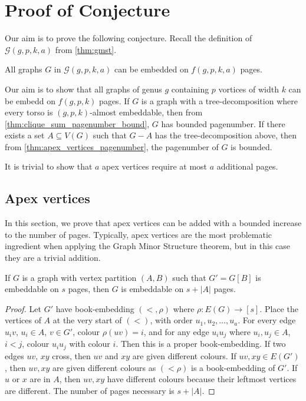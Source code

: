 \chapter{Proof of Conjecture}\label{chap:Proving_The_Theorem}
Our aim is to prove the following conjecture. Recall the definition of $\mathcal{G}(g, p, k, a)$ from \cref{thm:gmst}. 
\begin{conjecture}\label{conj:gmst_conjecture_pagenumber}
	All graphs $G$ in $\mathcal{G}(g, p, k, a)$ can be embedded on \(f(g, p, k, a)\) pages.
\end{conjecture}
Our aim is to show that all graphs of genus \(g\) containing \(p\) vortices of width \(k\) can be embedd on \(f(g, p, k)\) pages. If $G$ is a graph with a tree-decomposition where every torso is $(g, p, k)$-almost embeddable, then from \cref{thm:clique_sum_pagenumber_bound}, $G$ has bounded pagenumber. If there exists a set $A \subseteq V(G)$ such that $G - A$ has the tree-decomposition above, then from \cref{thm:apex_vertices_pagenumber}, the pagenumber of $G$ is bounded.

It is trivial to show that $a$ apex vertices require at most $a$ additional pages.
\section{Apex vertices}
In this section, we prove that apex vertices can be added with a bounded increase to the number of pages. Typically, apex vertices are the most problematic ingredient when applying the Graph Minor Structure theorem, but in this case they are a trivial addition.
\begin{theorem}\label{thm:apex_vertices_pagenumber}
	If \(G\) is a graph with vertex partition \((A, B)\) such that \(G' = G[B]\) is embeddable on $s$ pages, then \(G\) is embeddable on \(s + |A| \) pages.
\end{theorem}
\begin{proof}
	Let \(G'\) have book-embedding \((<, \rho)\) where $\rho : E(G) \rightarrow [s]$. Place the vertices of \(A\) at the very start of \((<)\), with order $u_1, u_2, \ldots, u_a$. For every edge \(u_i v \), \(u_i \in A\), \(v \in G'\), colour \(\rho(uv) = i\), and for any edge \(u_i u_j\) where $u_i, u_j \in A$, $i < j$, colour $u_i u_j$ with colour $i$. Then this is a proper book-embedding. If two edges $uv$, $xy$ cross, then $uv$ and $xy$ are given different colours. If $uv, xy \in E(G')$, then $uv, xy$ are given different colours as $(< \rho)$ is a book-embedding of $G'$. If $u$ or $x$ are in $A$, then $uv, xy$ have different colours because their leftmost vertices are different. The number of pages necessary is $s + |A|$. 
\end{proof}

